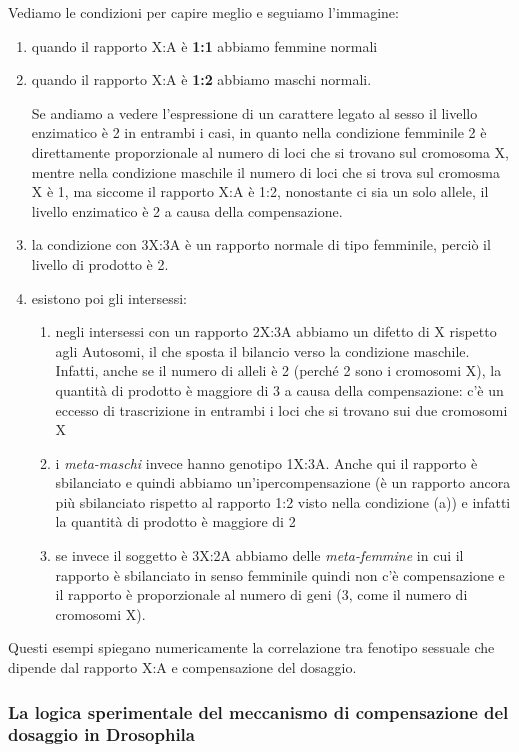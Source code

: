 \documentclass[11pt]{book}
\begin{document}
Vediamo le condizioni per capire meglio e seguiamo l’immagine:
\begin{enumerate}
\item quando il rapporto X:A è \textbf{1:1} abbiamo femmine normali
\item quando il rapporto X:A è \textbf{1:2} abbiamo maschi normali.

Se andiamo a vedere l’espressione di un carattere legato al sesso il livello enzimatico è 2 in entrambi i casi, in quanto nella condizione femminile 2 è direttamente proporzionale al numero di loci che si trovano sul cromosoma X, mentre nella condizione maschile il numero di loci che si trova sul cromosma X è 1, ma siccome il rapporto X:A è 1:2, nonostante ci sia un solo allele, il livello enzimatico è 2 a causa della compensazione.

\item la condizione con 3X:3A è un rapporto normale di tipo femminile, perciò il livello di prodotto è 2.

\item esistono poi gli intersessi:
	\begin{enumerate}
	\item negli intersessi con un rapporto 2X:3A abbiamo un difetto di X rispetto agli Autosomi, il che sposta il bilancio verso la condizione maschile. Infatti, anche se il numero di alleli è 2 (perché 2 sono i cromosomi X), la quantità di prodotto è maggiore di 3 a causa della compensazione: c’è un eccesso di trascrizione in entrambi i loci che si trovano sui due cromosomi X
	\item i \emph{meta-maschi} invece hanno genotipo 1X:3A. Anche qui il rapporto è sbilanciato e quindi abbiamo un’ipercompensazione (è un rapporto ancora più sbilanciato rispetto al rapporto 1:2 visto nella condizione (a)) e infatti la quantità di prodotto è maggiore di 2
	\item se invece il soggetto è 3X:2A abbiamo delle \emph{meta-femmine} in cui il rapporto è sbilanciato in senso femminile quindi non c’è compensazione e il rapporto è proporzionale al numero di geni (3, come il numero di cromosomi X).
	\end{enumerate}
\end{enumerate}

Questi esempi spiegano numericamente la correlazione tra fenotipo sessuale che dipende dal rapporto X:A e compensazione del dosaggio.

\subsubsection{La logica sperimentale del meccanismo di compensazione del dosaggio in Drosophila}
\end{document}
